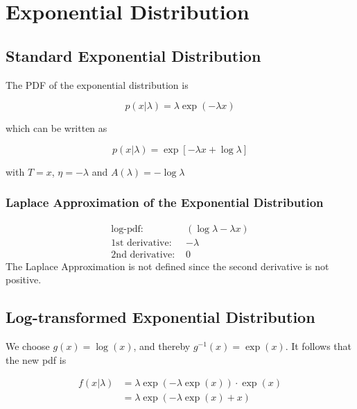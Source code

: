 \section{Exponential Distribution}

\subsection{Standard Exponential Distribution}

The PDF of the exponential distribution is

\begin{equation}
	p(x| \lambda) = \lambda \exp(-\lambda x)
	\label{eq:exponential_pdf}
\end{equation}

which can be written as

\begin{equation}
	p(x|\lambda) = \exp\left[-\lambda x + \log\lambda\right]
	\label{eq:exponential_exp_family}
\end{equation}

with $T=x$, $\eta = -\lambda$ and $A(\lambda) = -\log\lambda$

\subsubsection{Laplace Approximation of the Exponential Distribution}

\begin{align*}
\text{log-pdf: } &\left( \log \lambda - \lambda x\right) \\
\text{1st derivative: }& - \lambda \\
\text{2nd derivative: }& 0
\end{align*}
The Laplace Approximation is not defined since the second derivative is not positive. 

\subsection{Log-transformed Exponential Distribution}

We choose $g(x) = \log(x)$, and thereby $g^{-1}(x) = \exp(x)$. It follows that the new pdf is 

\begin{align}
	f(x|\lambda) &= \lambda \exp(-\lambda \exp(x)) \cdot \exp(x) \\ \nonumber
	&= \lambda \exp(-\lambda \exp(x) + x)
\end{align}

